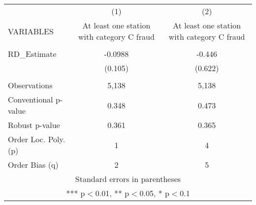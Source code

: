 \begin{tabular}{lcc} \hline
 & (1) & (2) \\
VARIABLES & At least one station with category C fraud & At least one station with category C fraud \\ \hline
 &  &  \\
RD\_Estimate & -0.0988 & -0.446 \\
 & (0.105) & (0.622) \\
 &  &  \\
Observations & 5,138 & 5,138 \\
Conventional p-value & 0.348 & 0.473 \\
Robust p-value & 0.361 & 0.365 \\
Order Loc. Poly. (p) & 1 & 4 \\
 Order Bias (q) & 2 & 5 \\ \hline
\multicolumn{3}{c}{ Standard errors in parentheses} \\
\multicolumn{3}{c}{ *** p$<$0.01, ** p$<$0.05, * p$<$0.1} \\
\end{tabular}
